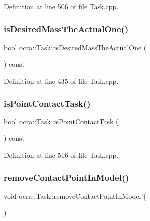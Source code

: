 Definition at line 506 of file Task.\+cpp.

\hypertarget{classocra_1_1Task_a3eebcc1acbafc633b36c83761973e09b}{}\label{classocra_1_1Task_a3eebcc1acbafc633b36c83761973e09b} 
\subsubsection{\texorpdfstring{is\+Desired\+Mass\+The\+Actual\+One()}{isDesiredMassTheActualOne()}}
{\footnotesize\ttfamily bool ocra\+::\+Task\+::is\+Desired\+Mass\+The\+Actual\+One (\begin{DoxyParamCaption}{ }\end{DoxyParamCaption}) const}



Definition at line 435 of file Task.\+cpp.

\hypertarget{classocra_1_1Task_ac45a4479fbec48fdc0e4ea1ed5ffbd4c}{}\label{classocra_1_1Task_ac45a4479fbec48fdc0e4ea1ed5ffbd4c} 
\subsubsection{\texorpdfstring{is\+Point\+Contact\+Task()}{isPointContactTask()}}
{\footnotesize\ttfamily bool ocra\+::\+Task\+::is\+Point\+Contact\+Task (\begin{DoxyParamCaption}{ }\end{DoxyParamCaption}) const}



Definition at line 516 of file Task.\+cpp.

\hypertarget{classocra_1_1Task_a5dc76ab144162dd2960999c19510033f}{}\label{classocra_1_1Task_a5dc76ab144162dd2960999c19510033f} 
\subsubsection{\texorpdfstring{remove\+Contact\+Point\+In\+Model()}{removeContactPointInModel()}}
{\footnotesize\ttfamily void ocra\+::\+Task\+::remove\+Contact\+Point\+In\+Model (\begin{DoxyParamCaption}{ }\end{DoxyParamCaption})\hspace{0.3cm}{\ttfamily [protected]}}



